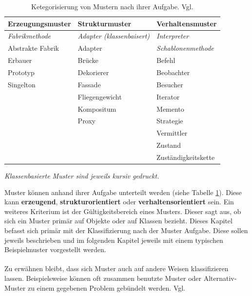 \documentclass[fontsize=11pt,a4paper,final]{scrreprt}[2003/01/01]
\begin{document}
\begin{table}[H]
	\caption{Ketegorisierung von Mustern nach ihrer Aufgabe. Vgl. \cite[S. 14]{gamma2004}}\label{ta:Klassifizierung}
	\begin{center}
		\begin{tabular}{|l|l|l|}
			\hline
			\bf Erzeugungsmuster   & \bf Strukturmuster                & \bf Verhaltensmuster       \\
			\hline
			\textit{Fabrikmethode} & \textit{Adapter (klassenbaisert)} & \textit{Interpreter}       \\
			Abstrakte Fabrik       & Adapter                           & \textit{Schablonenmethode} \\
			Erbauer                & Brücke                           & Befehl                     \\
			Prototyp               & Dekorierer                        & Beobachter                 \\
			Singelton              & Fassade                           & Besucher                   \\
			                       & Fliegengewicht                    & Iterator                   \\
			                       & Kompositum                        & Memento                    \\
			                       & Proxy                             & Strategie                  \\
			                       &                                   & Vermittler                 \\
			                       &                                   & Zustand                    \\
			                       &                                   & Zuständigkeitskette       \\
			\hline
		\end{tabular}
	\end{center}
	\begin{center}
		\small{\textit{Klassenbasierte Muster sind jeweils kursiv gedruckt.}}
	\end{center}
\end{table}

Muster können anhand ihrer Aufgabe unterteilt werden (siehe Tabelle \ref{ta:Klassifizierung}). Diese kann \textbf{ erzeugend},\textbf{ strukturorientiert} oder \textbf{verhaltensorientiert} sein. Ein weiteres Kriterium ist der Gültigkeitsbereich eines Musters. Dieser sagt aus, ob sich ein Muster primär auf Objekte oder auf Klassen bezieht.
Dieses Kapitel befasst sich primär mit der Klassifizierung nach der Muster Aufgabe. Diese sollen jeweils beschrieben und im folgenden Kapitel jeweils mit einem typischen Beispielmuster vorgestellt werden. 
\\ \\
Zu erwähnen bleibt, dass sich Muster auch auf andere Weisen klassifizieren lassen. Beispielsweise können oft zusammen benutzte Muster oder Alternativ-Muster zu einem gegebenen Problem gebündelt werden. Vgl. \cite[S. 14]{gamma2004}
\end{document}
